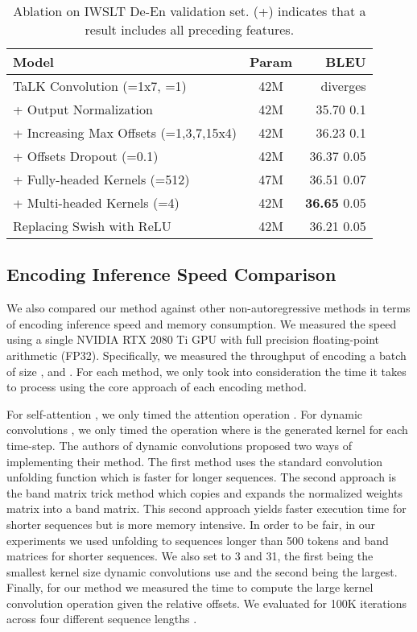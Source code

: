 \documentclass{article}
\def\talkconvfull{TaLK Convolution}
\def\iwslt{IWSLT De-En}
\begin{document}
\begin{table*}[t]
\centering
\caption{Ablation on \iwslt{} validation set. (+) indicates that a result includes all preceding features.}
\vskip 0.15in
\begin{tabular}{lcr}
\toprule
Model & Param & BLEU \\
\midrule
\talkconvfull{} (=1x7, =1) & 42M & diverges \\
+ Output Normalization & 42M & 35.70  0.1 \\
+ Increasing Max Offsets (=1,3,7,15x4) & 42M & 36.23  0.1 \\
+ Offsets Dropout (=0.1) & 42M & 36.37  0.05 \\
+ Fully-headed Kernels (=512) & 47M & 36.51  0.07 \\
+ Multi-headed Kernels (=4) & 42M & \textbf{36.65}  0.05 \\
\midrule
Replacing Swish with ReLU & 42M & 36.21  0.05 \\
\bottomrule
\end{tabular}
\label{tab:ablation}
\end{table*}

\subsection{Encoding Inference Speed Comparison}
We also compared our method against other non-autoregressive methods in terms of encoding inference speed and memory consumption. We measured the speed using a single NVIDIA RTX 2080 Ti GPU with full precision floating-point arithmetic (FP32). Specifically, we measured the throughput of encoding a batch of size ,  and . For each method, we only took into consideration the time it takes to process using the core approach of each encoding method. 

For self-attention \cite{vaswani2017attention}, we only timed the attention operation . For dynamic convolutions \cite{wu2019pay}, we only timed the operation  where  is the generated kernel for each time-step. The authors of dynamic convolutions proposed two ways of implementing their method. The first method uses the standard convolution unfolding function which is faster for longer sequences. The second approach is the band matrix trick method which copies and expands the normalized weights matrix into a band matrix. This second approach yields faster execution time for shorter sequences but is more memory intensive. In order to be fair, in our experiments we used unfolding to sequences longer than 500 tokens and band matrices for shorter sequences. We also set  to 3 and 31, the first being the smallest kernel size dynamic convolutions use and the second being the largest. Finally, for our method we measured the time to compute the large kernel convolution operation given the relative offsets. 
We evaluated for 100K iterations across four different sequence lengths .
\end{document}
